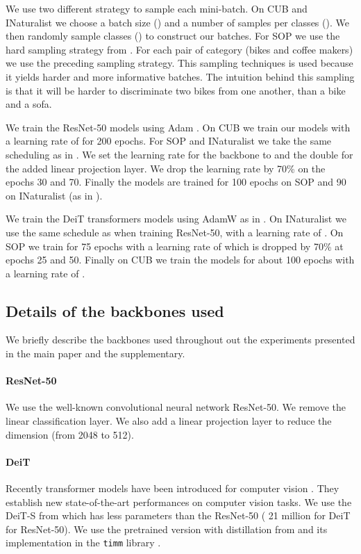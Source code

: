 We use two different strategy to sample each mini-batch.
On CUB and INaturalist we choose a batch size () and a number of samples per classes (). We then randomly sample classes () to construct our batches.
For SOP we use the hard sampling strategy from \cite{fastap}. For each pair of category (\eg bikes and coffee makers) we use the preceding sampling strategy. This sampling techniques is used because it yields harder and more informative batches. The intuition behind this sampling is that it will be harder to discriminate two bikes from one another, than a bike and a sofa.


We train the ResNet-50 models using Adam \cite{adam}.
On CUB we train our models with a learning rate of  for 200 epochs.
For SOP and INaturalist we take the same scheduling as in \cite{smoothap}. We set the learning rate for the backbone to  and the double for the added linear projection layer. We drop the learning rate by 70\% on the epochs 30 and 70. Finally the models are trained for 100 epochs on SOP and 90 on INaturalist (as in \cite{smoothap}).

We train the DeiT transformers models using AdamW \cite{adamw} as in \cite{transformer_ir}. On INaturalist we use the same schedule as when training ResNet-50, with a learning rate of . On SOP we train for 75 epochs with a learning rate of  which is dropped by 70\% at epochs 25 and 50. Finally on CUB we train the models for about 100 epochs with a learning rate of .

\subsection{Details of the backbones used}

We briefly describe the backbones used throughout out the experiments presented in the main paper and the supplementary.

\paragraph*{ResNet-50 \cite{resnet50}} We use the well-known convolutional neural network ResNet-50. We remove the linear classification layer. We also add a linear projection layer to reduce the dimension (\eg from 2048 to 512).

\paragraph*{DeiT \cite{deit}} Recently transformer models have been introduced for computer vision \cite{vit,deit}. They establish new state-of-the-art performances on computer vision tasks. We use the DeiT-S from \cite{deit} which has less parameters than the ResNet-50 ( 21 million for DeiT  for ResNet-50). We use the pretrained version with distillation from \cite{deit} and its implementation in the \texttt{timm} library \cite{timm}.


